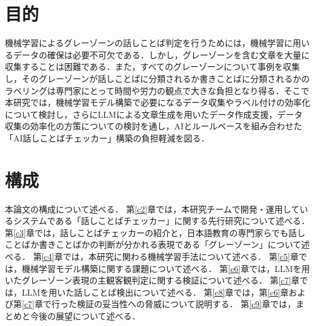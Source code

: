 \section{目的}
機械学習によるグレーゾーンの話しことば判定を行うためには，機械学習に用いるデータの確保は必要不可欠である．しかし，グレーゾーンを含む文章を大量に収集することは困難である．また，すべてのグレーゾーンについて事例を収集し，そのグレーゾーンが話しことばに分類されるか書きことばに分類されるかのラベリングは専門家にとって時間や労力の観点で大きな負担となり得る．そこで本研究では，機械学習モデル構築で必要になるデータ収集やラベル付けの効率化について検討し，さらにLLMによる文章生成を用いたデータ作成支援，データ収集の効率化の方策についての検討を通し，AIとルールベースを組み合わせた「AI話しことばチェッカー」構築の負担軽減を図る．

\section{構成}
本論文の構成について述べる．
第\ref{c2}章では，本研究チームで開発・運用しているシステムである「話しことばチェッカー」に関する先行研究について述べる．
第\ref{c3}章では，話しことばチェッカーの紹介と，日本語教育の専門家らでも話しことばか書きことばかの判断が分かれる表現である「グレーゾーン」について述べる．
第\ref{c4}章では，本研究に関わる機械学習手法について述べる．
第\ref{c5}章では，機械学習モデル構築に関する課題について述べる．
第\ref{c6}章では，LLMを用いたグレーゾーン表現の主観客観判定に関する検証について述べる．
第\ref{c7}章では，LLMを用いた話しことば検出について述べる．
第\ref{c8}章では，第\ref{c6}章および第\ref{c7}章で行った検証の妥当性への脅威について説明する．
第\ref{c9}章では，まとめと今後の展望について述べる．
